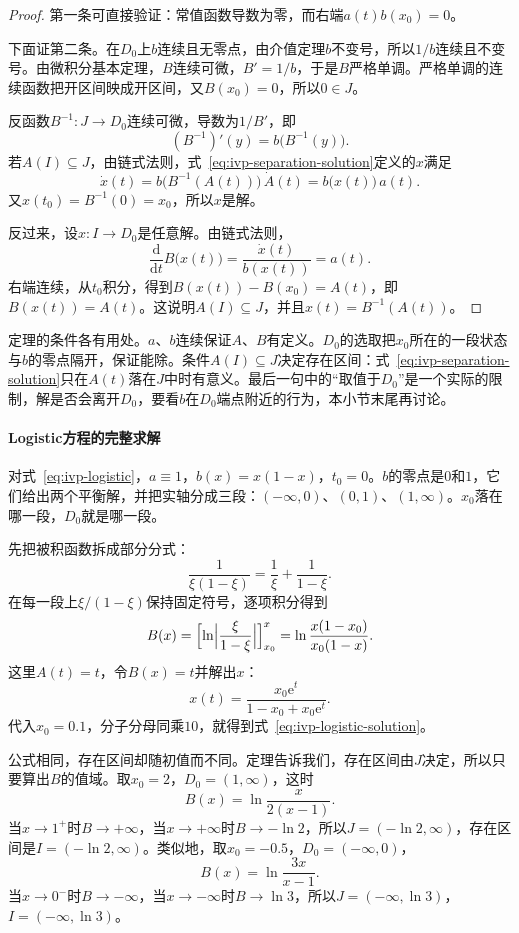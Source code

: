 \begin{proof}
 第一条可直接验证：常值函数导数为零，而右端$a(t)b(x_0)=0$。

 下面证第二条。在$D_0$上$b$连续且无零点，由介值定理$b$不变号，所以$1/b$连续且不变号。由微积分基本定理，$B$连续可微，$B'=1/b$，于是$B$严格单调。严格单调的连续函数把开区间映成开区间，又$B(x_0)=0$，所以$0\in J$。

 反函数$B^{-1}:J\to D_0$连续可微，导数为$1/B'$，即
 \[
 (B^{-1})'(y)=b\bigl(B^{-1}(y)\bigr).
 \]
 若$A(I)\subseteq J$，由链式法则，式~\eqref{eq:ivp-separation-solution}定义的$x$满足
 \[
 \dot{x}(t)=b\bigl(B^{-1}(A(t))\bigr)\,\dot{A}(t)=b\bigl(x(t)\bigr)\,a(t).
 \]
 又$x(t_0)=B^{-1}(0)=x_0$，所以$x$是解。

 反过来，设$x:I\to D_0$是任意解。由链式法则，
 \[
 \frac{\mathrm{d}}{\mathrm{d}t}B\bigl(x(t)\bigr)=\frac{\dot{x}(t)}{b(x(t))}=a(t).
 \]
 右端连续，从$t_0$积分，得到$B(x(t))-B(x_0)=A(t)$，即$B(x(t))=A(t)$。这说明$A(I)\subseteq J$，并且$x(t)=B^{-1}(A(t))$。
\end{proof}

定理的条件各有用处。$a$、$b$连续保证$A$、$B$有定义。$D_0$的选取把$x_0$所在的一段状态与$b$的零点隔开，保证能除。条件$A(I)\subseteq J$决定存在区间：式~\eqref{eq:ivp-separation-solution}只在$A(t)$落在$J$中时有意义。最后一句中的“取值于$D_0$”是一个实际的限制，解是否会离开$D_0$，要看$b$在$D_0$端点附近的行为，本小节末尾再讨论。

\paragraph{Logistic方程的完整求解}
对式~\eqref{eq:ivp-logistic}，$a\equiv 1$，$b(x)=x(1-x)$，$t_0=0$。$b$的零点是$0$和$1$，它们给出两个平衡解，并把实轴分成三段：$(-\infty,0)$、$(0,1)$、$(1,\infty)$。$x_0$落在哪一段，$D_0$就是哪一段。

先把被积函数拆成部分分式：
\[
 \frac{1}{\xi(1-\xi)}=\frac{1}{\xi}+\frac{1}{1-\xi}.
\]
在每一段上$\xi/(1-\xi)$保持固定符号，逐项积分得到
\[
 B(x)=\Bigl[\ln\Bigl\lvert\frac{\xi}{1-\xi}\Bigr\rvert\Bigr]_{x_0}^{x}
 =\ln\frac{x(1-x_0)}{x_0(1-x)}.
\]
这里$A(t)=t$，令$B(x)=t$并解出$x$：
\begin{equation}
 x(t)=\frac{x_0\mathrm{e}^{t}}{1-x_0+x_0\mathrm{e}^{t}}.
 \label{eq:ivp-logistic-general-solution}
\end{equation}
代入$x_0=0.1$，分子分母同乘$10$，就得到式~\eqref{eq:ivp-logistic-solution}。

公式相同，存在区间却随初值而不同。定理告诉我们，存在区间由$J$决定，所以只要算出$B$的值域。取$x_0=2$，$D_0=(1,\infty)$，这时
\[
 B(x)=\ln\frac{x}{2(x-1)}.
\]
当$x\to 1^{+}$时$B\to+\infty$，当$x\to+\infty$时$B\to-\ln 2$，所以$J=(-\ln 2,\infty)$，存在区间是$I=(-\ln 2,\infty)$。类似地，取$x_0=-0.5$，$D_0=(-\infty,0)$，
\[
 B(x)=\ln\frac{3x}{x-1}.
\]
当$x\to 0^{-}$时$B\to-\infty$，当$x\to-\infty$时$B\to\ln 3$，所以$J=(-\infty,\ln 3)$，$I=(-\infty,\ln 3)$。

